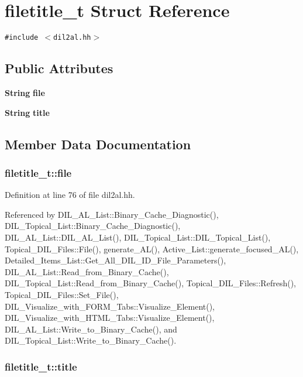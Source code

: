 \section{filetitle\_\-t  Struct Reference}
\label{structfiletitle__t}
{\tt \#include $<$dil2al.hh$>$}

\subsection*{Public Attributes}
\begin{CompactItemize}
\item 
{\bf String} {\bf file}
\item 
{\bf String} {\bf title}
\end{CompactItemize}


\subsection{Member Data Documentation}
\subsubsection{ filetitle\_\-t::file}\label{structfiletitle__t_m0}




Definition at line 76 of file dil2al.hh.

Referenced by DIL\_\-AL\_\-List::Binary\_\-Cache\_\-Diagnostic(), DIL\_\-Topical\_\-List::Binary\_\-Cache\_\-Diagnostic(), DIL\_\-AL\_\-List::DIL\_\-AL\_\-List(), DIL\_\-Topical\_\-List::DIL\_\-Topical\_\-List(), Topical\_\-DIL\_\-Files::File(), generate\_\-AL(), Active\_\-List::generate\_\-focused\_\-AL(), Detailed\_\-Items\_\-List::Get\_\-All\_\-DIL\_\-ID\_\-File\_\-Parameters(), DIL\_\-AL\_\-List::Read\_\-from\_\-Binary\_\-Cache(), DIL\_\-Topical\_\-List::Read\_\-from\_\-Binary\_\-Cache(), Topical\_\-DIL\_\-Files::Refresh(), Topical\_\-DIL\_\-Files::Set\_\-File(), DIL\_\-Visualize\_\-with\_\-FORM\_\-Tabs::Visualize\_\-Element(), DIL\_\-Visualize\_\-with\_\-HTML\_\-Tabs::Visualize\_\-Element(), DIL\_\-AL\_\-List::Write\_\-to\_\-Binary\_\-Cache(), and DIL\_\-Topical\_\-List::Write\_\-to\_\-Binary\_\-Cache().
\subsubsection{ filetitle\_\-t::title}\label{structfiletitle__t_m1}




